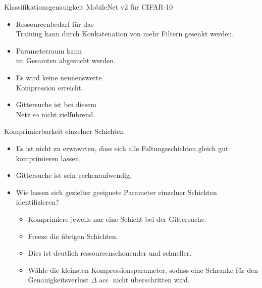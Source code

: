 \documentclass[aspectratio=169, 12pt]{beamer}
\DeclareMathOperator{\acc}{acc}
\begin{document}
\begin{frame}{Klassifikationsgenauigkeit MobileNet v2 für CIFAR-10}
  \begin{figure}
    \vspace{-1.7cm}
      \begin{figure}
      \end{figure}
  \end{figure}
  \leavevmode
  \vspace{-1.0cm}
  \begin{itemize}
    \item Ressourcenbedarf für das \\ Training kann durch Konkatenation von mehr Filtern gesenkt werden.
    \item Parameterraum kann \\ im Gesamten abgesucht werden.
    \item Es wird keine nennenswerte \\ Kompression erreicht.
    \item Gittersuche ist bei diesem \\ Netz so nicht zielführend.
  \end{itemize}
\end{frame}

\begin{frame}{Komprimierbarkeit einzelner Schichten}
  \begin{itemize}
    \item Es ist nicht zu erwawrten, dass sich alle Faltungsschichten gleich gut komprimieren lassen.
    \item Gittersuche ist sehr rechenaufwendig.
    \item Wie lassen sich gezielter geeignete Parameter einzelner Schichten identifizieren?
    \begin{itemize}
      \item Komprimiere jeweils nur eine Schicht bei der Gittersuche.
      \item \glqq Freeze\grqq{} die übrigen Schichten.
      \item Dies ist deutlich ressourcenschonender und schneller.
      \item Wähle die kleinsten Kompressionsparameter, sodass eine Schranke für den Genauigkeitsverlust $\Delta \acc$ nicht überschritten wird.
    \end{itemize}
  \end{itemize}  
\end{frame}
\end{document}
